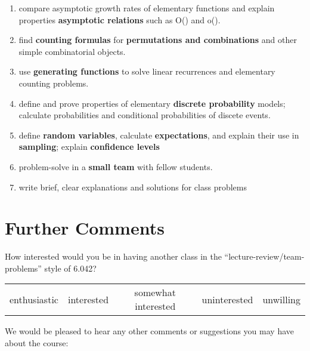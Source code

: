 \documentclass[handout]{mcs}
\begin{document}
\begin{enumerate}
\item \label{asymptotics} compare asymptotic growth rates of
  elementary functions and explain properties \textbf{asymptotic
    relations} such as O() and o().

\item \label{counting} find \textbf{counting formulas} for
  \textbf{permutations and combinations} and other simple
  combinatorial objects. \hfill \brule{0.5in}

\item\label{generating functions} use \textbf{generating functions} to solve
  linear recurrences and elementary counting problems.
  \hfill \brule{0.5in}

\item \label{probability} define and prove properties of elementary
  \textbf{discrete probability} models; calculate probabilities and
  conditional probabilities of discete events.  \hfill \brule{0.5in}

\item \label{random_variables} define \textbf{random variables},
  calculate \textbf{expectations}, and explain their use
  in \textbf{sampling}; explain \textbf{confidence levels} \hfill
  \brule{0.5in}

\item \label{student teams} problem-solve in a \textbf{small team} with
fellow students.  \hfill \brule{0.5in}

\item \label{writing} write brief, clear explanations and solutions for
  class problems \hfill \brule{0.5in}
\end{enumerate}

\newpage
\section*{Further Comments}

How interested would you be in having another class in the
``lecture-review/team-problems'' style of 6.042?
\begin{center}
\begin{tabular}{ccccc}
enthusiastic &  interested &  somewhat interested  &  uninterested &  unwilling
\end{tabular}
\end{center}

\vspace{0.5in}
We would be pleased to hear any other comments or suggestions you may have
about the course:

\textbox{\hspace{7in}
\vspace{6in}}
\end{document}
